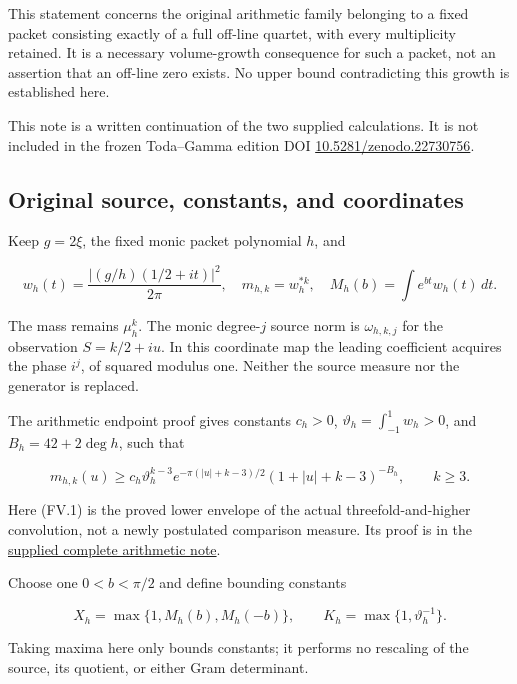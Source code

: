 This statement concerns the original arithmetic family belonging to a fixed packet consisting exactly of a full off-line quartet, with every multiplicity retained. It is a necessary volume-growth consequence for such a packet, not an assertion that an off-line zero exists. No upper bound contradicting this growth is established here.

This note is a written continuation of the two supplied calculations. It is not included in the frozen Toda--Gamma edition DOI \href{https://doi.org/10.5281/zenodo.22730756}{10.5281/zenodo.22730756}.

\subsection[\hspace{0.4em}Original source, constants, and coordinates]{Original source, constants, and coordinates}\label{four-volume-original-source-constants-and-coordinates}

Keep \(g=2\xi\), the fixed monic packet polynomial \(h\), and

\[
w_h(t)=\frac{|(g/h)(1/2+it)|^2}{2\pi},\quad
m_{h,k}=w_h^{*k},\quad M_h(b)=\int e^{bt}w_h(t)\,dt.
\]

The mass remains \(\mu_h^k\). The monic degree-\(j\) source norm is \(\omega_{h,k,j}\) for the observation \(S=k/2+iu\). In this coordinate map the leading coefficient acquires the phase \(i^j\), of squared modulus one. Neither the source measure nor the generator is replaced.

The arithmetic endpoint proof gives constants \(c_h>0\), \(\vartheta_h=\int_{-1}^1w_h>0\), and \(B_h=42+2\deg h\), such that

\[
m_{h,k}(u)\ge c_h\vartheta_h^{k-3}
 e^{-\pi(|u|+k-3)/2}(1+|u|+k-3)^{-B_h},\qquad k\ge3.
\tag{FV.1}
\]

Here (FV.1) is the proved lower envelope of the actual threefold-and-higher convolution, not a newly postulated comparison measure. Its proof is in the \href{https://github.com/KokunoYumeto/zeta-function-research-reader/blob/952ef9fee1e1419b6858d920354de8fa99430b7d/workbenches/tau-arithmetic-endpoint-bounds/delivery/NOTE.tex}{supplied complete arithmetic note}.

Choose one \(0<b<\pi/2\) and define bounding constants

\[
X_h=\max\{1,M_h(b),M_h(-b)\},\qquad
K_h=\max\{1,\vartheta_h^{-1}\}.
\]

Taking maxima here only bounds constants; it performs no rescaling of the source, its quotient, or either Gram determinant.

